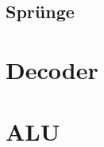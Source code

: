 \documentclass[paper=a4,fontsize=12pt]{scrreprt}
\begin{document}

\subsection{Sprünge}


\section{Decoder}



\section{ALU}
\end{document}
